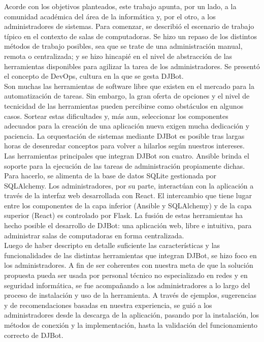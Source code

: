 \documentclass[a4paper,12pt]{article}
\begin{document}
Acorde con los objetivos planteados, este trabajo apunta, por un lado, a la comunidad académica del área de la informática y, por el otro, a los administradores de sistemas. Para comenzar, se describió el escenario de trabajo típico en el contexto de salas de computadoras. Se hizo un repaso de los distintos métodos de trabajo posibles, sea que se trate de una administración manual, remota o centralizada; y se hizo hincapié en el nivel de abstracción de las herramientas disponibles para agilizar la tarea de los administradores. Se presentó el concepto de DevOps, cultura en la que se gesta DJBot.\\

Son muchas las herramientas de software libre que existen en el mercado para la automatización de tareas. Sin embargo, la gran oferta de opciones y el nivel de tecnicidad de las herramientas pueden percibirse como obstáculos en algunos casos. Sortear estas dificultades y, más aun, seleccionar los componentes adecuados para la creación de una aplicación nueva exigen mucha dedicación y paciencia. La orquestación de sistemas mediante DJBot es posible tras largas horas de desenredar conceptos para volver a hilarlos según nuestros intereses.\\

Las herramientas principales que integran DJBot son cuatro. Ansible brinda el soporte para la ejecución de las tareas de administración propiamente dichas. Para hacerlo, se alimenta de la base de datos SQLite gestionada por SQLAlchemy. Los administradores, por su parte, interactúan con la aplicación a través de la interfaz web desarrollada con React. El intercambio que tiene lugar entre los componentes de la capa inferior (Ansible y SQLAlchemy) y de la capa superior (React) es controlado por Flask. La fusión de estas herramientas ha hecho posible el desarrollo de DJBot: una aplicación web, libre e intuitiva, para administrar salas de computadoras en forma centralizada.\\

Luego de haber descripto en detalle suficiente las características y las 
funcionalidades de las distintas herramientas que integran DJBot, se hizo foco en los administradores. A fin de ser coherentes con nuestra meta de que la solución propuesta pueda ser usada por personal técnico no especializado en redes y en seguridad informática, se fue acompañando a los administradores a lo largo del proceso de instalación y uso de la herramienta. A través de ejemplos, sugerencias y de recomendaciones basadas en nuestra experiencia, se guió a los administradores desde la descarga de la aplicación, pasando por la instalación, los métodos de conexión y la implementación, hasta la validación del funcionamiento correcto de DJBot.\\
\end{document}
